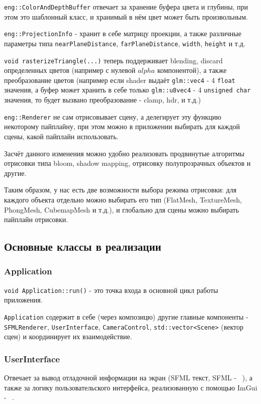 \documentclass[14pt]{extarticle}
\begin{document}
\texttt{eng::ColorAndDepthBuffer} отвечает за хранение буфера цвета и глубины, при этом это шаблонный класс, и хранимый в нём цвет может быть произвольным.

\texttt{eng::ProjectionInfo} - хранит в себе матрицу проекции, а также различные параметры типа \texttt{nearPlaneDistance}, \texttt{farPlaneDistance}, \texttt{width}, \texttt{height} и т.д.

\texttt{void rasterizeTriangle(...)} теперь поддерживает blending, discard определенных цветов (например с нулевой $alpha$ компонентой), а также преобразование цветов (например если shader выдаёт \texttt{glm::vec4} - 4 \texttt{float} значения, а буфер может хранить в себе только \texttt{glm::u8vec4} - 4 \texttt{unsigned char} значения, то будет вызвано преобразование - clamp, hdr, и т.д.)

\texttt{eng::Renderer} не сам отрисовывает сцену, а делегирует эту функцию некоторому пайплайну, при этом можно в приложении выбирать для каждой сцены, какой пайплайн использовать. 

Засчёт данного изменения можно удобно реализовать продвинутые алгоритмы отрисовки типа bloom, shadow mapping, отрисовку полупрозрачных объектов и другие. 

Таким образом, у нас есть две возможности выбора режима отрисовки: для каждого объекта отдельно можно выбирать его тип (FlatMesh, TextureMesh, PhongMesh, CubemapMesh и т.д.), и глобально для сцены можно выбирать пайплайн отрисовки.

\subsection{Основные классы в реализации}
\subsubsection{Application}
\texttt{void Application::run()} - это точка входа в основной цикл работы приложения. 

\texttt{Application} содержит в себе (через композицю) другие главные компоненты - \texttt{SFMLRenderer}, \texttt{UserInterface}, \texttt{CameraControl}, \texttt{std::vector<Scene>} (вектор сцен) и координирует их взаимодействие.

\subsubsection{UserInterface}
Отвечает за вывод отладочной информации на экран (SFML текст, SFML - ~\cite{sfml}), а также за логику пользовательского интерфейса, реализованную с помощью ImGui - ~\cite{imgui}.
\end{document}
